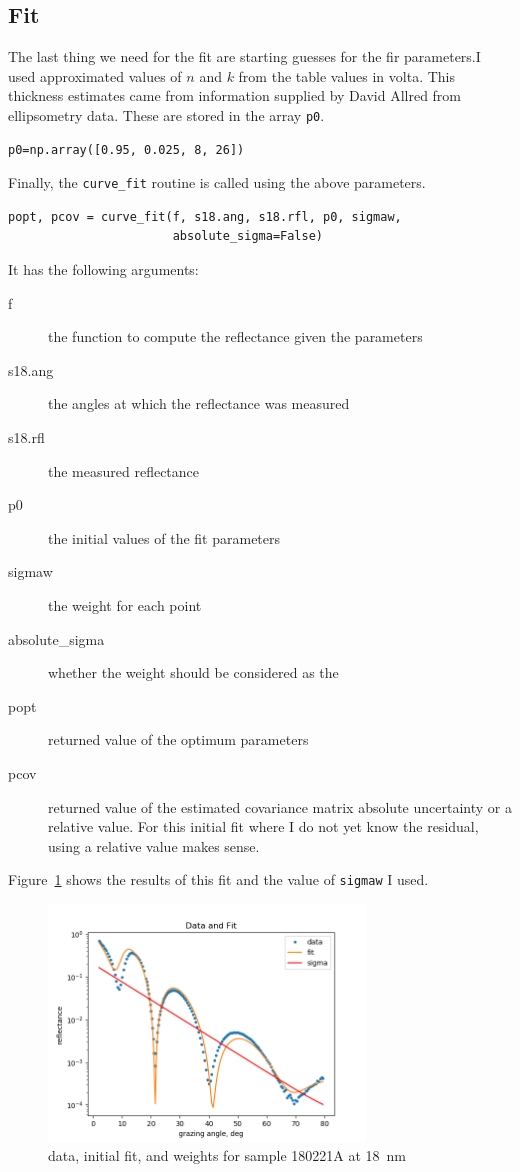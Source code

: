 \documentclass[english]{scrartcl}
\begin{document}
\subsection{Fit}
The last thing we need for the fit are starting guesses for
the fir parameters.I used approximated values of $n$ and $k$
from the table values in volta. This thickness estimates came from
information supplied by David Allred from ellipsometry data. These
are stored in the array \texttt{p0}.
\begin{lstlisting}
p0=np.array([0.95, 0.025, 8, 26])
\end{lstlisting}
Finally, the \texttt{curve\_fit} routine is called using the above
parameters.
\begin{lstlisting}
popt, pcov = curve_fit(f, s18.ang, s18.rfl, p0, sigmaw,
                       absolute_sigma=False)
\end{lstlisting}
It has the following arguments:
\begin{description}
\item[f] the function to compute the reflectance given the parameters
\item[s18.ang] the angles at which the reflectance was measured
\item[s18.rfl] the measured reflectance
\item[p0] the initial values of the fit parameters
\item[sigmaw] the weight for each point
\item[absolute\_sigma] whether the weight should be considered as the
\item[popt] returned value of the optimum parameters
\item[pcov] returned value of the estimated covariance matrix
absolute uncertainty or a relative value. For this initial fit where I do
not yet know the residual, using a relative value makes sense.
\end{description}
Figure~\ref{fig:fit18} shows the results of this fit and the value of
\texttt{sigmaw} I used.
\begin{figure}[htb]
  \begin{center}
    \includegraphics[width=0.75\textwidth]{images/fit18}
  \end{center}
  \caption{\label{fig:fit18}data, initial fit, and weights for
  sample 180221A at 18~nm}
\end{figure}
\end{document}
